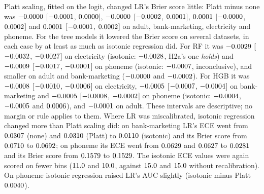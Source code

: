 \documentclass[11pt]{article}
\newcommand{\md}[3]{$#1$ [$#2$, $#3$]}
\newcommand{\ds}[1]{\textsf{#1}}
\newcommand{\ad}{\ds{adult}}
\newcommand{\bm}{\ds{bank-marketing}}
\newcommand{\el}{\ds{electricity}}
\newcommand{\ph}{\ds{phoneme}}
\newcommand{\cat}[1]{\emph{#1}}
\begin{document}
Platt scaling, fitted on the logit, changed LR's Brier score little: Platt minus none was
\md{\AdultLrPlattMinusNoneBrierMean}{\AdultLrPlattMinusNoneBrierLo}{\AdultLrPlattMinusNoneBrierHi},
\md{\BankLrPlattMinusNoneBrierMean}{\BankLrPlattMinusNoneBrierLo}{\BankLrPlattMinusNoneBrierHi},
\md{\ElecLrPlattMinusNoneBrierMean}{\ElecLrPlattMinusNoneBrierLo}{\ElecLrPlattMinusNoneBrierHi}
and
\md{\PhonemeLrPlattMinusNoneBrierMean}{\PhonemeLrPlattMinusNoneBrierLo}{\PhonemeLrPlattMinusNoneBrierHi}
on \ad, \bm, \el{} and \ph. For the tree models it lowered the Brier score on several datasets,
in each case by at least as much as isotonic regression did. For RF it was
\md{\ElecRfPlattMinusNoneBrierMean}{\ElecRfPlattMinusNoneBrierLo}{\ElecRfPlattMinusNoneBrierHi}
on \el{} (isotonic: $-0.0028$, H2a's one \cat{holds}) and
\md{\PhonemeRfPlattMinusNoneBrierMean}{\PhonemeRfPlattMinusNoneBrierLo}{\PhonemeRfPlattMinusNoneBrierHi}
on \ph{} (isotonic: $-0.0007$, inconclusive), and smaller on \ad{} and \bm{}
($-0.0000$ and $-0.0002$). For HGB it was
\md{\ElecHgbPlattMinusNoneBrierMean}{\ElecHgbPlattMinusNoneBrierLo}{\ElecHgbPlattMinusNoneBrierHi}
on \el,
\md{\BankHgbPlattMinusNoneBrierMean}{\BankHgbPlattMinusNoneBrierLo}{\BankHgbPlattMinusNoneBrierHi}
on \bm{} and
\md{\PhonemeHgbPlattMinusNoneBrierMean}{\PhonemeHgbPlattMinusNoneBrierLo}{\PhonemeHgbPlattMinusNoneBrierHi}
on \ph{} (isotonic: $-0.0004$, $-0.0005$ and $0.0006$), and
$-0.0001$ on \ad.
These intervals are descriptive; no margin or rule applies to them. Where LR was
miscalibrated, isotonic regression changed more than Platt scaling did: on \bm{} LR's ECE went
from $0.0307$ (none) and $0.0310$ (Platt) to $0.0110$ (isotonic) and its
Brier score from $0.0710$ to $0.0692$; on \ph{} its ECE went from
$0.0629$ and $0.0627$ to $0.0281$ and its Brier score from
$0.1579$ to $0.1529$. The isotonic ECE values were again scored on
fewer bins ($11.0$ and $10.0$, against $15.0$ and
$15.0$ without recalibration). On \ph{} isotonic
regression raised LR's AUC slightly (isotonic minus Platt $0.0040$).
\end{document}
